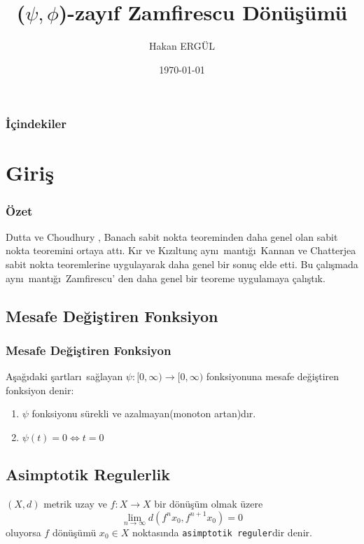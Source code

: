 \documentclass[8pt]{beamer}
\title{($\psi,\phi$)-zay\i f Zamfirescu D\"on\"u\c{s}\"um\"u}
\author{Hakan ERG\"UL}
\institute{Atat\"{u}rk \"{U}niversitesi}
\date{\today}
\begin{document}
\begin{frame}
\titlepage
\end{frame}
\begin{frame}
  \frametitle{\.{I}\c{c}indekiler}
  \tableofcontents
\end{frame}


\section{Giri\c{s}}
\begin{frame}
  \frametitle{\"Ozet}
  \textrm{Dutta ve Choudhury \cite{Dutta2008}, Banach sabit nokta teoreminden daha genel olan sabit nokta teoremini ortaya att\i . K\i r ve K\i z\i ltun\c{c} \cite{Kir2013} ayn\i \ mant\i \u{g}\i \ Kannan\cite{Kannan1969} ve Chatterjea\cite{Chatterjea1972} sabit nokta teoremlerine uygulayarak daha genel bir sonu\c{c} elde etti. Bu \c{c}al\i \c{s}mada ayn\i \ mant\i \u{g}\i \ Zamfirescu\cite{Zamfirescu1972}' den daha genel bir teoreme uygulamaya \c{c}al\i \c{s}t\i k.}
\end{frame}


\subsection{Mesafe De\u{g}i\c{s}tiren Fonksiyon}
\begin{frame}
\frametitle{Mesafe De\u{g}i\c{s}tiren Fonksiyon}
  \begin{definition}
     A\c{s}a\u{g}\i daki \c{s}artlar\i \ sa\u{g}layan $\psi:[0,\infty)\to[0,\infty)$ fonksiyonuna mesafe de\u{g}i\c{s}tiren fonksiyon denir:
     \begin{enumerate}
      \item $\psi$ fonksiyonu s\"urekli ve azalmayan(monoton artan)d\i r.
      \item $\psi(t)=0\Leftrightarrow t=0$
     \end{enumerate}
  \end{definition}
\end{frame}

\subsection{Asimptotik Regulerlik}
\begin{frame}
  \begin{definition}
     $(X,d)$ metrik uzay ve $f: X \rightarrow X$ bir d\"{o}n\"{u}\c{s}\"{u}m olmak \"uzere
     \begin{equation*}
       \lim_{n\to \infty}d(f^nx_0,f^{n+1}x_{0})=0 
     \end{equation*}
oluyorsa $f$ d\"{o}n\"{u}\c{s}\"{u}m\"{u} $x_0\in X$ noktas\i nda \texttt{asimptotik reguler}dir denir.
\cite{Browder1966}
  \end{definition}
\end{frame}
\end{document}
